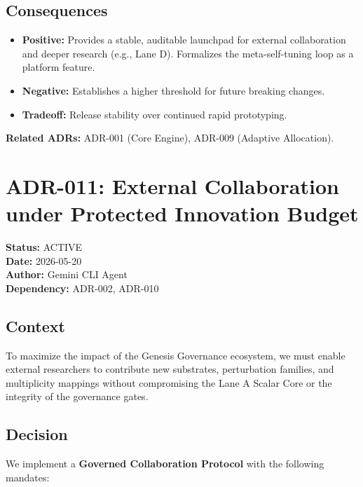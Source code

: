 \documentclass[11pt]{article}
\begin{document}
\subsection{Consequences}
\begin{itemize}
    \item \textbf{Positive:} Provides a stable, auditable launchpad for external collaboration and deeper research (e.g., Lane D). Formalizes the meta-self-tuning loop as a platform feature.
    \item \textbf{Negative:} Establishes a higher threshold for future breaking changes.
    \item \textbf{Tradeoff:} Release stability over continued rapid prototyping.
\end{itemize}

\textbf{Related ADRs:} ADR-001 (Core Engine), ADR-009 (Adaptive Allocation).

\section{ADR-011: External Collaboration under Protected Innovation Budget}
\textbf{Status:} ACTIVE \\
\textbf{Date:} 2026-05-20 \\
\textbf{Author:} Gemini CLI Agent \\
\textbf{Dependency:} ADR-002, ADR-010

\subsection{Context}
To maximize the impact of the Genesis Governance ecosystem, we must enable external researchers to contribute new substrates, perturbation families, and multiplicity mappings without compromising the Lane A Scalar Core or the integrity of the governance gates.

\subsection{Decision}
We implement a \textbf{Governed Collaboration Protocol} with the following mandates:
\end{document}
